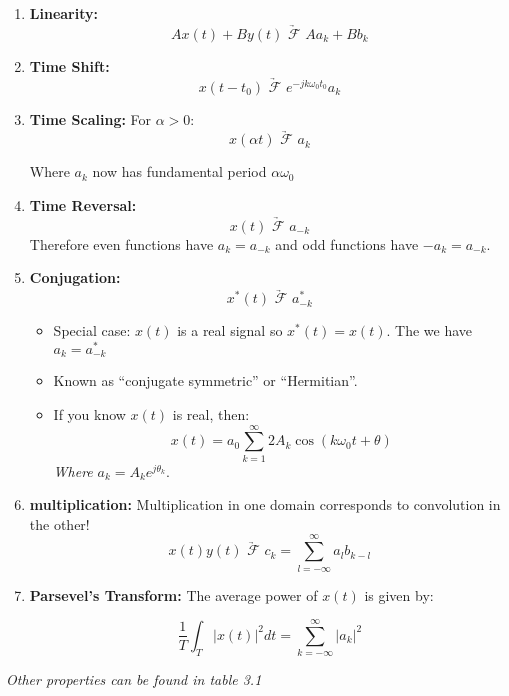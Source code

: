 \documentclass[a4paper,12pt]{report}
\begin{document}
\begin{enumerate}
\item \textbf{Linearity: } 
\begin{equation}
Ax(t) + By(t) \underrightarrow{\,\,\mathcal{F}\,\,} Aa_k + Bb_k
\end{equation}

\item \textbf{Time Shift: } 
\begin{equation}
x(t-t_0) \underrightarrow{\,\,\mathcal{F}\,\,} e^{-jk\omega_0 t_0} a_k
\end{equation}


\item \textbf{Time Scaling: } For $\alpha > 0$: 
\begin{equation}
x(\alpha t) \underrightarrow{\,\,\mathcal{F}\,\,} a_k
\end{equation}

Where $a_k$ now has fundamental period $\alpha \omega_0$

\item \textbf{Time Reversal: } 
\begin{equation}
x(t) \underrightarrow{\,\,\mathcal{F}\,\,} a_{-k}
\end{equation}
Therefore even functions have $a_k = a_{-k}$ and odd functions have $-a_k = a_{-k}$.

\item \textbf{Conjugation: } 
\begin{equation}
x^* (t) \underrightarrow{\,\,\mathcal{F}\,\,} a_{-k}^*
\end{equation}
\begin{itemize}
\item Special case: $x(t)$ is a real signal so $x^*(t) = x(t)$. The we have $a_k = a_{-k}^*$
\item Known as ``conjugate symmetric'' or ``Hermitian''.
\item If you know $x(t)$ is real, then: $$x(t) = a_0 \sum_{k=1}^{\infty} 2 A_k \cos (k\omega_0 t + \theta)$$
\textit{Where} $a_k = A_k e^{j\theta_k}$.
\end{itemize}

\item \textbf{multiplication: } Multiplication in one domain corresponds to convolution in the other!
\begin{equation}
x(t) y(t) \underrightarrow{\,\,\mathcal{F}\,\,} c_k = \sum_{l = -\infty}^{\infty} a_l b_{k-l}
\end{equation}

\item \textbf{Parsevel's Transform: } The average power of $x(t)$ is given by: 

\begin{equation}
\frac{1}{T} \int_{T}^{} |x(t)|^2 dt = \sum_{k=-\infty}^{\infty} |a_k|^2
\end{equation}

\end{enumerate}
\textit{Other properties can be found in table 3.1}
\end{document}

